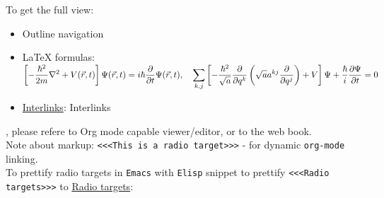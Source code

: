 \documentclass[a4paper,14pt,oneside]{book}
\begin{document}
To get the full view:\\
\begin{itemize}
\item Outline navigation\\
\item \LaTeX{} formulas: \({\displaystyle\left[{-\frac{\hbar^{2}}{2m}}\nabla^{2}+V(\vec{r},t)\right]\Psi({\vec{r}},t)=i\hbar{\partial\over\partial{t}}\Psi({\vec{r}},t),\quad\sum_{k,j}\left[-{\frac{\hbar^{2}}{\sqrt{a}}}{\frac{\partial}{\partial{q^{k}}}}\left({\sqrt{a}}a^{kj}{\frac{\partial}{\partial{q^{j}}}}\right)+V\right]\Psi+{\frac{\hbar}{i}}{\frac{\partial{\Psi}}{\partial{t}}}=0}\)\\
\item \hyperref[org27b1c17]{Interlinks}: \label{org27b1c17}Interlinks\\
\end{itemize}

, please refere to Org mode capable viewer/editor, or to the web book.\\

Note about markup: \texttt{<<<This is a radio target>>>} - for dynamic \texttt{org-mode} linking.\\

To prettify radio targets in \texttt{Emacs} with \texttt{Elisp} snippet to prettify \texttt{<<<Radio targets>>>} to \uline{Radio targets}:\\
\end{document}
